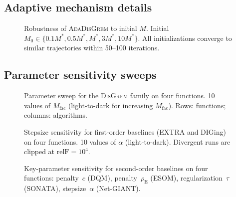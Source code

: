 \documentclass[review,onefignum,onetabnum]{siamart171218}
\begin{document}
	\subsection{Adaptive mechanism details}
	
	\begin{figure}[htbp]
		\centering
		\caption{Robustness of \textsc{AdaDisGrem} to initial $M$.
			Initial $M_0\in\{0.1M^*,0.5M^*,M^*,3M^*,10M^*\}$.
			All initializations converge to similar trajectories within
			50--100 iterations.}
		\label{fig:ada_init_m}
	\end{figure}
	
	\subsection{Parameter sensitivity sweeps}
	
	\begin{figure}[htbp]
		\centering
		\caption{Parameter sweep for the \textsc{DisGrem} family
			on four functions.
			10 values of $M_{\mathrm{fac}}$ (light-to-dark for increasing
			$M_{\mathrm{fac}}$).
			Rows: functions; columns: algorithms.}
		\label{fig:sweep_disgrem}
	\end{figure}
	
	\begin{figure}[htbp]
		\centering
		\caption{Stepsize sensitivity for first-order baselines
			(EXTRA and DIGing) on four functions.
			10 values of $\alpha$ (light-to-dark).
			Divergent runs are clipped at $\mathrm{relF}=10^4$.}
		\label{fig:sweep_first}
	\end{figure}
	
	\begin{figure}[htbp]
		\centering
		\caption{Key-parameter sensitivity for second-order baselines
			on four functions: penalty~$c$ (DQM), penalty~$\rho_{\mathrm{E}}$ (ESOM),
			regularization~$\tau$ (SONATA), stepsize~$\alpha$ (Net-GIANT).}
		\label{fig:sweep_second}
	\end{figure}
	
\end{document}
